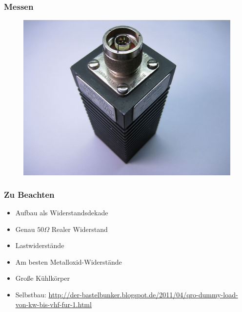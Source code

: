 \begin{frame}
  \frametitle{Messen}
  \begin{center}
    \begin{figure}
      \includegraphics[width=.99\textwidth,height=.75\textheight,keepaspectratio]{e17/DummyLoad.jpg}
    \end{figure}
  \end{center}
\end{frame}

\begin{frame}
  \frametitle{Zu Beachten}
  \begin{itemize}
    \item Aufbau als Widerstandsdekade
    \item Genau $50 \Omega$ Realer Widerstand
    \item Lastwiderstände
    \item Am besten Metalloxid-Widerstände
    \item Große Kühlkörper
    \item Selbstbau: \url{http://der-bastelbunker.blogspot.de/2011/04/qro-dummy-load-von-kw-bis-vhf-fur-1.html}
  \end{itemize}
\end{frame}

